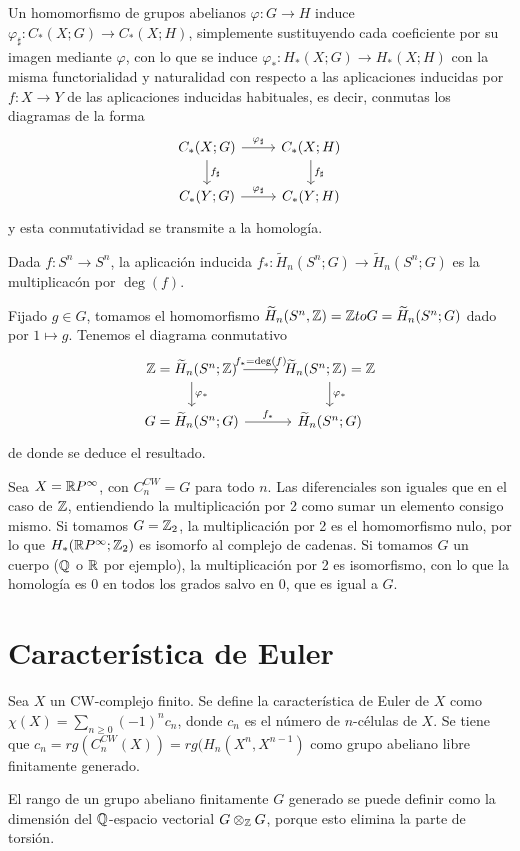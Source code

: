 \documentclass[TA.tex]{subfiles}
\begin{document}
Un homomorfismo de grupos abelianos $\varphi:G\to H$  induce $\varphi_\sharp:C_*(X;G)\to C_*(X;H)$, simplemente sustituyendo cada coeficiente por su imagen mediante $\varphi$, con lo que se induce $\varphi_*:H_*(X;G)\to H_*(X;H)$ con la misma functorialidad y naturalidad con respecto a las aplicaciones inducidas por $f:X\to Y$ de las aplicaciones inducidas habituales, es decir, conmutas los diagramas de la forma
\[
\begin{tikzcd}
C_*(X;G)\arrow[r, "\varphi_\sharp"]\arrow[d, "f_\sharp"] & C_*(X;H)\arrow[d, "f_\sharp"]\\
C_*(Y;G)\arrow[r, "\varphi_\sharp"] & C_*(Y;H)
\end{tikzcd}
\]
y esta conmutatividad se transmite a la homología.
 
 \begin{prop}
 Dada $f:S^n\to S^n$, la aplicación inducida $f_*:\widetilde{H}_n(S^n;G)\to\widetilde{H}_n(S^n;G)$ es la multiplicacón por $\deg(f)$. 
 \end{prop}
\begin{dem}
Fijado $g\in G$, tomamos el homomorfismo $\widetilde{H}_n(S^n,\mathbb{Z})=\mathbb{Z} to G=\widetilde{H}_n(S^n;G)$ dado por $1\mapsto g$. Tenemos el diagrama conmutativo
\[
\begin{tikzcd}
\Z=\widetilde{H}_n(S^n;\Z)\arrow[r, "f_*=\deg(f)"]\arrow[d, "\varphi_*"] & \widetilde{H}_n(S^n;\Z)=\Z\arrow[d, "\varphi_*"]\\
G=\widetilde{H}_n(S^n;G)\arrow[r, "f_*"] &\widetilde{H}_n(S^n;G)
\end{tikzcd}
\]
de donde se deduce el resultado.
\end{dem}


\begin{ej}
Sea $X=\mathbb{R} P^{\infty}$, con $C_n^{CW}=G$ para todo $n$. Las diferenciales son iguales que en el caso de $\mathbb{Z}$, entiendiendo la multiplicación por 2 como sumar un elemento consigo mismo. Si tomamos $G=\mathbb{Z}_2$, la multiplicación por 2 es el homomorfismo nulo, por lo que $H_*(\mathbb{R} P^{\infty};\mathbb{Z}_2)$ es isomorfo al complejo de cadenas. Si tomamos $G$ un cuerpo ($\mathbb{Q}$ o $\mathbb{R}$ por ejemplo), la multiplicación por 2 es isomorfismo, con lo que la homología es 0 en todos los grados salvo en 0, que es igual a $G$. 
\end{ej}


\section{Característica de Euler}
\begin{defi}
Sea $X$ un CW-complejo finito. Se define la característica de Euler de $X$ como $\chi(X)=\sum_{n\geq 0}(-1)^nc_n$, donde $c_n$ es el número de $n$-células de $X$. Se tiene que $c_n=rg(C_n^{CW}(X))=rg(H_n(X^n,X^{n-1})$ como grupo abeliano libre finitamente generado. 
\end{defi}
\begin{nota}
El rango de un grupo abeliano finitamente $G$ generado se puede definir como la dimensión del $\mathbb{Q}$-espacio vectorial $G\otimes_{\mathbb{Z}} G$, porque esto elimina la parte de torsión.
\end{nota}
\end{document}

